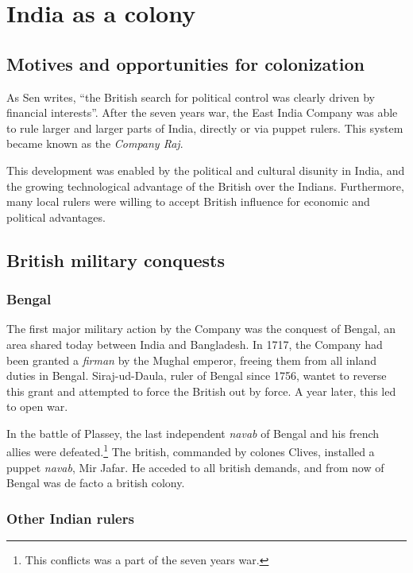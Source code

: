 \documentclass[11pt, a4paper, headings=standardclasses]{scrartcl}
\begin{document}
\section{India as a colony}

\subsection{Motives and opportunities for colonization}

As Sen writes, ``the British search for political control was clearly driven by financial interests''\autocite[Section 3]{tnr}. After the seven years war, the East India Company was able to rule larger and larger parts of India, directly or via puppet rulers. This system became known as the \textit{Company Raj}.\autocite{parliament}

This development was enabled by the political and cultural disunity in India, and the growing technological advantage of the British over the Indians. Furthermore, many local rulers were willing to accept British influence for economic and political advantages.

\subsection{British military conquests}

\subsubsection{Bengal}
The first major military action by the Company was the conquest of Bengal, an area shared today between India and Bangladesh. In 1717, the Company had been granted a \textit{firman} by the Mughal emperor, freeing them from all inland duties in Bengal.\autocite[257]{RF} Siraj-ud-Daula, ruler of Bengal since 1756, wantet to reverse this grant and attempted to force the British out by force. A year later, this led to open war.\autocite[258]{RF}

In the battle of Plassey, the last independent \textit{navab} of Bengal and his french allies were defeated.\footnote{This conflicts was a part of the seven years war.} The british, commanded by colones Clives, installed a puppet \textit{navab}, Mir Jafar. He acceded to all british demands, and from now of Bengal was de facto a british colony.\autocite[268]{RF}

\subsubsection{Other Indian rulers}
\end{document}
